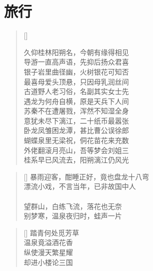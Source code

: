 \chapter{旅行}
\thispagestyle{empty}
\renewcommand{\poemtoc}{section}
\settowidth{\versewidth}{久仰桂林阳朔名，今朝有缘得相见}
\begin{verse}[\versewidth]

久仰桂林阳朔名，今朝有缘得相见\\
导游一直高声语，先抑后扬众君喜\\
银子岩里曲径幽，火树银花可知否\\
最喜母爱头顶悬，只因母乳润丝间\\
古道野人老习俗，名副其实女士先\\
遇龙为何舟自横，原是天兵下人间\\
苏秦不在遭屠戮，浑然不知湿全身\\
意犹未尽下漓江，二十纸币最嚣张\\
卧龙凤雏困龙潭，甚比曹公误徐郎\\
蝴蝶泉里无梁祝，侗花苗花来充数\\
外佬翻滚月亮山，吾等梦会刘姐三\\
桂系早已风流去，阳朔漓江仍风光
\end{verse}

\renewcommand{\poemtoc}{section}
\settowidth{\versewidth}{久仰桂林阳朔名，今朝有缘得相见}
\begin{verse}[\versewidth]
暴雨迎客，酣睡正好，竟也盘龙十八弯\\
漂流小戏，不言当年，已非故国中人\\
~\\
望群山，白练飞流，落花也无奈\\
别梦寒，温泉夜归时，蛙声一片\\
\end{verse}

\renewcommand{\poemtoc}{section}
\settowidth{\versewidth}{踏青何处觅芳草}
\begin{verse}[\versewidth]
踏青何处觅芳草\\
温泉竟溢酒花香\\
纵使漫天繁星耀\\
却进小楼论三国
\end{verse}
